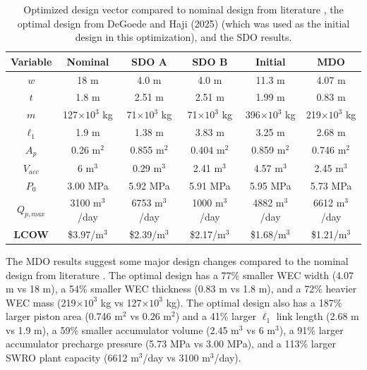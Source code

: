 \documentclass[a4paper,12pt]{elsarticle}
\begin{document}
\begin{table}[b]
    \scriptsize
    \centering
    \caption{Optimized design vector compared to nominal design from literature \cite{YJecon2017}, the optimal design from DeGoede and Haji (2025) \cite{idetc2025} (which was used as the initial design in this optimization), and the SDO results.}
    \begin{tabular}{cccccc}
        \hline
        \textbf{Variable} & \textbf{Nominal} \cite{YJecon2017} & \textbf{SDO A} & \textbf{SDO B} & \textbf{Initial} \cite{idetc2025} & \textbf{MDO} \\
        \hline
        $w$ & 18 m & 4.0 m & 4.0 m & 11.3 m & 4.07 m \\
        $t$ & 1.8 m & 2.51 m & 2.51 m & 1.99 m & 0.83 m \\
        $m$ & 127$\times10^3$ kg & 71$\times10^3$ kg & 71$\times10^3$ kg & 396$\times10^3$ kg & 219$\times10^3$ kg \\
        $\ell_1$ & 1.9 m & 1.38 m & 3.83 m & 3.25 m & 2.68 m \\
        $A_p$ & 0.26 m$^2$ & 0.855 m$^2$ & 0.404 m$^2$ & 0.859 m$^2$ & 0.746 m$^2$ \\
        $V_{acc}$ & 6 m$^3$ & 0.29 m$^3$ & 2.41 m$^3$ & 4.57 m$^3$ & 2.45 m$^3$ \\
        $P_0$ & 3.00 MPa & 5.92 MPa & 5.91 MPa & 5.95 MPa & 5.73 MPa \\
        $Q_{p,max}$ & 3100 m$^3$/day & 6753 m$^3$/day & 1000 m$^3$/day & 4882 m$^3$/day & 6612 m$^3$/day \\
        \hline
        \textbf{LCOW} & \$3.97/m$^3$ & \$2.39/m$^3$ & \$2.17/m$^3$ & \$1.68/m$^3$ & \$1.21/m$^3$ \\
        \hline
    \end{tabular}
    \label{tab:opt}
\end{table}

The MDO results suggest some major design changes compared to the nominal design from literature \cite{YJecon2017}. The optimal design has a 77\% smaller WEC width (4.07 m vs 18 m), a 54\% smaller WEC thickness (0.83 m vs 1.8 m), and a 72\% heavier WEC mass (219$\times10^3$ kg vs 127$\times10^3$ kg). The optimal design also has a 187\% larger piston area (0.746 m$^2$ vs 0.26 m$^2$) and a 41\% larger $\ell_1$ link length (2.68 m vs 1.9 m), a 59\% smaller accumulator volume (2.45 m$^3$ vs 6 m$^3$), a 91\% larger accumulator precharge pressure (5.73 MPa vs 3.00 MPa), and a 113\% larger SWRO plant capacity (6612 m$^3$/day vs 3100 m$^3$/day).
\end{document}
